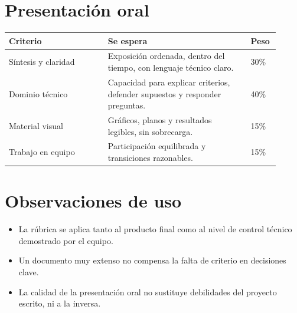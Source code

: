 \documentclass[11pt]{scrartcl}
\begin{document}
\section{Presentación oral}

\begin{center}
\begin{tabular}{p{0.34\linewidth} p{0.49\linewidth} p{0.08\linewidth}}
  \toprule
  \textbf{Criterio} & \textbf{Se espera} & \textbf{Peso} \\
  \midrule
  Síntesis y claridad & Exposición ordenada, dentro del tiempo, con
    lenguaje técnico claro. & 30\% \\
  Dominio técnico & Capacidad para explicar criterios, defender
    supuestos y responder preguntas. & 40\% \\
  Material visual & Gráficos, planos y resultados legibles, sin
    sobrecarga. & 15\% \\
  Trabajo en equipo & Participación equilibrada y transiciones
    razonables. & 15\% \\
  \bottomrule
\end{tabular}
\end{center}

\section{Observaciones de uso}
\begin{itemize}
  \item La rúbrica se aplica tanto al producto final como al nivel de
    control técnico demostrado por el equipo.
  \item Un documento muy extenso no compensa la falta de criterio en
    decisiones clave.
  \item La calidad de la presentación oral no sustituye debilidades del
    proyecto escrito, ni a la inversa.
\end{itemize}
\end{document}
